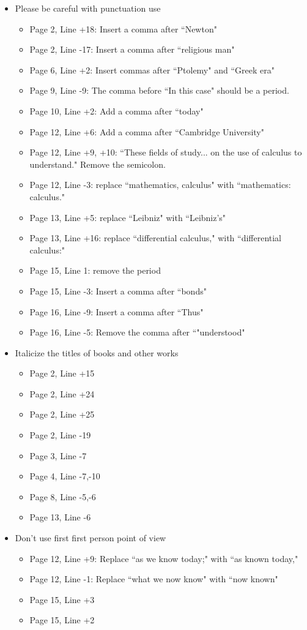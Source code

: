 \documentclass[11pt]{article}
\begin{document}
\begin{itemize}
	\item Please be careful with punctuation use
	\begin{itemize}
		\item Page 2, Line +18: Insert a comma after ``Newton"
		\item Page 2, Line -17: Insert a comma after ``religious man"
		\item Page 6, Line +2: Insert commas after ``Ptolemy" and ``Greek era"
		\item Page 9, Line -9: The comma before ``In this case" should be a period.
		\item Page 10, Line +2: Add a comma after ``today"
		\item Page 12, Line +6: Add a comma after ``Cambridge University"
		\item Page 12, Line +9, +10: ``These fields of study... on the use of calculus to understand." Remove the semicolon. 
		\item Page 12, Line -3: replace ``mathematics, calculus" with ``mathematics: calculus."
		\item Page 13, Line +5: replace ``Leibniz" with ``Leibniz’s"
		\item Page 13, Line +16: replace ``differential calculus," with ``differential calculus:"
		\item Page 15, Line 1: remove the period
		\item Page 15, Line -3: Insert a comma after ``bonds"
		\item Page 16, Line -9: Insert a comma after ``Thus"
		\item Page 16, Line -5: Remove the comma after ``"understood"
	\end{itemize}
	
	\item Italicize the titles of books and other works
	\begin{itemize}
		\item Page 2, Line +15
		\item Page 2, Line +24
		\item Page 2, Line +25
		\item Page 2, Line -19
		\item Page 3, Line -7
		\item Page 4, Line -7,-10
		\item Page 8, Line -5,-6
		\item Page 13, Line -6		
	\end{itemize}
	
	\item Don't use first first person point of view
	\begin{itemize}
		\item Page 12, Line +9: Replace ``as we know today;" with ``as known today,"
		\item Page 12, Line -1: Replace ``what we now know" with ``now known"
		\item Page 15, Line +3
		\item Page 15, Line +2
	\end{itemize}
	

\end{itemize}
\end{document}
